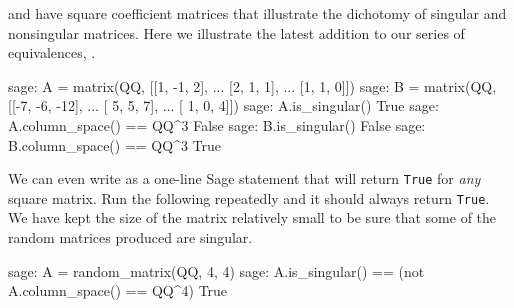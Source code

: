  and  have square coefficient matrices that illustrate the dichotomy of singular and nonsingular matrices.  Here we illustrate the latest addition to our series of equivalences, .
%
\begin{sageexample}
sage: A = matrix(QQ, [[1, -1, 2],
...                   [2,  1, 1],
...                   [1,  1, 0]])
sage: B = matrix(QQ, [[-7, -6, -12],
...                   [ 5,  5,   7],
...                   [ 1,  0,   4]])
sage: A.is_singular()
True
sage: A.column_space() == QQ^3
False
sage: B.is_singular()
False
sage: B.column_space() == QQ^3
True
\end{sageexample}
%
We can even write  as a one-line Sage statement that will return \verb?True? for \emph{any} square matrix.  Run the following repeatedly and it should always return \verb?True?.  We have kept the size of the matrix relatively small to be sure that some of the random matrices produced are singular.
%
\begin{sageexample}
sage: A = random_matrix(QQ, 4, 4)
sage: A.is_singular() == (not A.column_space() == QQ^4)
True
\end{sageexample}
%
\begin{sageverbatim}
\end{sageverbatim}
%
